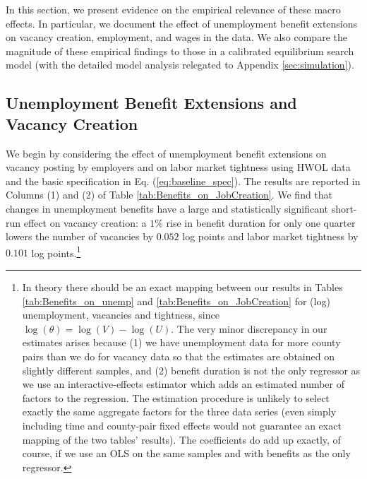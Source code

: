 \documentclass[12pt]{article}
\newcommand{\1}{\mathbf{1}}
\begin{document}
In this section, we present evidence on the empirical relevance of these macro effects. In particular, we document the effect of unemployment benefit extensions on vacancy creation, employment, and wages in the data. We also compare the magnitude of these empirical findings to those in a calibrated equilibrium search model (with the detailed model analysis relegated to Appendix \ref{sec:simulation}).


\subsection{Unemployment Benefit Extensions and Vacancy Creation}
\label{sec:vacancy}
We begin by considering the effect of unemployment benefit extensions on vacancy posting by employers and on labor market tightness using HWOL data and the basic specification in Eq. (\ref{eq:baseline_spec}). The results are reported in Columns (1) and (2) of Table \ref{tab:Benefits_on_JobCreation}. We find that changes in unemployment benefits have a large and statistically significant short-run effect on vacancy creation: a $1\%$ rise in benefit duration for only one quarter lowers the number of vacancies by $0.052$ log points and labor market tightness by $0.101$ log points.\footnote{In theory there should be an exact mapping between our results in Tables \ref{tab:Benefits_on_unemp} and \ref{tab:Benefits_on_JobCreation} for (log) unemployment, vacancies and tightness, since $\log(\theta) = \log(V) - \log(U)$. The very minor discrepancy in our estimates arises because (1) we have unemployment data for more county pairs than we do for vacancy data so that the estimates are obtained on slightly different samples, and (2) benefit duration is not the only regressor as we use an interactive-effects estimator \citep{bai:09} which adds an estimated number of factors to the regression. The estimation procedure is unlikely to select exactly the same aggregate factors for the three data series (even simply including time and county-pair fixed effects would not guarantee an exact mapping of the two tables' results). The coefficients do add up exactly, of course, if we use an OLS on the same samples and with benefits as the only regressor.}
\end{document}

